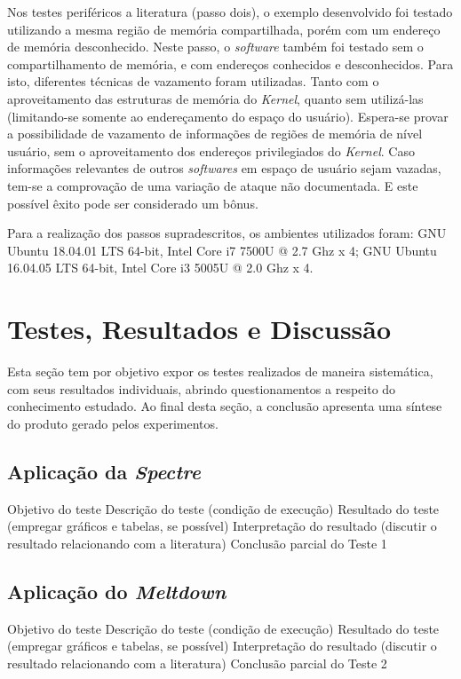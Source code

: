 \documentclass[
	article,			    %
	12pt,				    %
	oneside,			    %
	a4paper,			    %
	chapter=TITLE,		    %
	section=TITLE,		    %
	subsection=TITLE,	    %
	english,			    %
	brazil,				    %
	sumario=tradicional
]{abntex2}
\begin{document}
Nos testes periféricos a literatura (passo dois), o exemplo desenvolvido foi testado utilizando a mesma região de memória compartilhada, porém com um endereço de memória desconhecido. Neste passo, o \emph{software} também foi testado sem o compartilhamento de memória, e com endereços conhecidos e desconhecidos. Para isto, diferentes técnicas de vazamento foram utilizadas. Tanto com o aproveitamento das estruturas de memória do \emph{Kernel}, quanto sem utilizá-las (limitando-se somente ao endereçamento do espaço do usuário). Espera-se provar a possibilidade de vazamento de informações de regiões de memória de nível usuário, sem o aproveitamento dos endereços privilegiados do \emph{Kernel}. Caso informações relevantes de outros \emph{softwares} em espaço de usuário sejam vazadas, tem-se a comprovação de uma variação de ataque não documentada. E este possível êxito pode ser considerado um bônus.

Para a realização dos passos supradescritos, os ambientes utilizados foram: GNU Ubuntu 18.04.01 LTS 64-bit, Intel\textsuperscript{\tiny\textregistered} Core\textsuperscript{\tiny\texttrademark} i7 7500U @ 2.7 Ghz x 4; GNU Ubuntu 16.04.05 LTS 64-bit, Intel\textsuperscript{\tiny\textregistered} Core\textsuperscript{\tiny\texttrademark} i3 5005U @ 2.0 Ghz x 4.
\section{Testes, Resultados e Discussão}
Esta seção tem por objetivo expor os testes realizados de maneira sistemática, com seus resultados individuais, abrindo questionamentos a respeito do conhecimento estudado. Ao final desta seção, a conclusão apresenta uma síntese do produto gerado pelos experimentos.
\subsection{Aplicação da \emph{Spectre}}
Objetivo do teste
Descrição do teste (condição de execução)
Resultado do teste (empregar gráficos e tabelas, se possível)
Interpretação do resultado (discutir o resultado relacionando com a literatura)
Conclusão parcial do Teste 1
\subsection{Aplicação do \emph{Meltdown}}
Objetivo do teste
Descrição do teste (condição de execução)
Resultado do teste (empregar gráficos e tabelas, se possível)
Interpretação do resultado (discutir o resultado relacionando com a literatura)
Conclusão parcial do Teste 2
\end{document}
